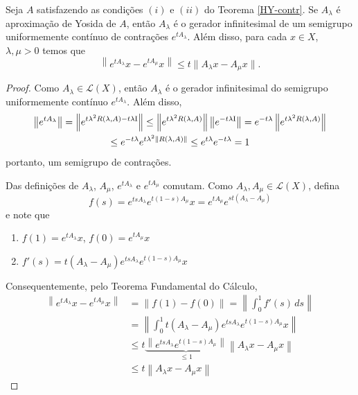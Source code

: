 \begin{lemma}
Seja $A$ satisfazendo as condições $(i)$ e $(ii)$ do Teorema \ref{HY-contr}. Se $A_\lambda$ é  aproximação de Yosida de $A$, então $A_\lambda$ é o gerador infinitesimal de um semigrupo uniformemente contínuo de contrações $e^{tA_\lambda}$. Além disso, para cada $x\in X$, $\lambda,\mu>0$ temos que
\begin{equation*}
\left\|e^{tA_\lambda}x-e^{tA_\mu}x\right\|\leq t\|A_\lambda x-A_\mu x\|.
\end{equation*}
\end{lemma}
\begin{proof}
Como $A_\lambda \in \mathcal{L}(X)$, então $A_\lambda$ é o gerador infinitesimal do semigrupo uniformemente contínuo $e^{tA_\lambda}$. Além disso,
\begin{multline*}
\left\|e^{tA_\lambda}\right\|
 =\left\|e^{t\lambda^2R(\lambda,A)-t\lambda \operatorname{\!I}}\right\|
\leq \left\|e^{t\lambda^2R(\lambda,A)}\right\|\left\|e^{-t\lambda \operatorname{\!I}} \right\|
=e^{-t\lambda }\left\|e^{t\lambda^2R(\lambda,A)}\right\|\\ 
\leq e^{-t\lambda }e^{t\lambda^2\left\|R(\lambda,A)\right\|}
 \leq e^{t\lambda }e^{-t\lambda }=1
\end{multline*}
portanto, um semigrupo de contrações.

Das definições de $A_\lambda$, $A_\mu$, $e^{tA_\lambda}$ e $e^{tA_\mu}$ 
comutam. Como $A_\lambda,  A_\mu\in\mathcal{L}(X)$, defina 
\[f(s)=e^{tsA_\lambda}e^{t(1-s)A_\mu}x=e^{tA_\mu}e^{st(A_\lambda-A_\mu)} \]
e note que
\begin{enumerate}
\item $f(1)=e^{tA_\lambda}x$, $f(0)=e^{tA_\mu}x$
\item $f'(s)=t(A_\lambda-A_\mu)e^{tsA_\lambda}e^{t(1-s)A_\mu}x$
\end{enumerate}
Consequentemente, pelo Teorema Fundamental do Cálculo,
\begin{align*}
\left\|e^{tA_\lambda}x-e^{tA_\mu}x \right\|
& =\left\|f(1)-f(0) \right\|=
\left\|\int_0^1 f'(s)\,ds \right\|\\
& =\left\|\int_0^1 
t(A_\lambda-A_\mu)e^{tsA_\lambda}e^{t(1-s)A_\mu}x\right\|\\
& \leq t\underbrace{\left\|e^{tsA_\lambda}e^{t(1-s)A_\mu}\right\|}_{\leq 1}   \left\|A_\lambda x-A_\mu x\right\|\\
& \leq t \left\|A_\lambda x-A_\mu x\right\|
\end{align*}
\end{proof}










